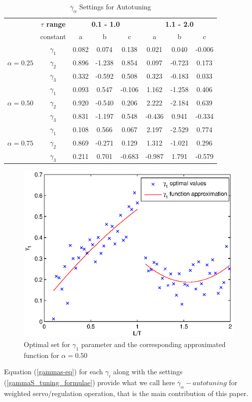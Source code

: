 \begin{table}[htb!]
\begin{center}
\caption{$\overline{\gamma}_{\alpha}$ Settings for Autotuning}
\label{gammas_settings}
\begin{tabular}{cc|ccc|ccc}
\cline{2-8} & \textbf{$\tau$ range} &
\multicolumn{3}{c|}{\textbf{0.1 - 1.0}} &
\multicolumn{3}{c}{\textbf{1.1 - 2.0}} \\ \cline{2-8} & constant &
a & b & c & a & b & c \\ \hline
              & \multicolumn{1}{c|}{$\gamma_1$} &0.082 & 0.074 &0.138 &0.021 & 0.040 &-0.006 \\
$\alpha=0.25$ & \multicolumn{1}{c|}{$\gamma_2$} &0.896 &-1.238 &0.854 &0.097 &-0.723 & 0.173 \\
              & \multicolumn{1}{c|}{$\gamma_3$} &0.332 &-0.592 &0.508 &0.323 &-0.183 & 0.033 \\
\hline
              & \multicolumn{1}{c|}{$\gamma_1$} &0.093 & 0.547 &-0.106 & 1.162 &-1.258 & 0.406 \\
$\alpha=0.50$ & \multicolumn{1}{c|}{$\gamma_2$} &0.920 &-0.540 & 0.206 & 2.222 &-2.184 & 0.639 \\
              & \multicolumn{1}{c|}{$\gamma_3$} &0.831 &-1.197 & 0.548 &-0.436 & 0.941 &-0.334 \\
\hline
              & \multicolumn{1}{c|}{$\gamma_1$} &0.108 & 0.566 & 0.067 & 2.197 &-2.529 & 0.774 \\
$\alpha=0.75$ & \multicolumn{1}{c|}{$\gamma_2$} &0.869 &-0.271 & 0.129 & 1.312 &-1.021 & 0.296 \\
              & \multicolumn{1}{c|}{$\gamma_3$} &0.211 & 0.701 &-0.683 &-0.987 & 1.791 &-0.579 \\
\hline
\end{tabular}
\end{center}
\end{table}

\begin{figure}[htb!]
    \begin{center}
        \includegraphics[width=0.8\linewidth]{gamma1function.eps}
        \caption{Optimal set for $\gamma_1$ parameter and the corresponding approximated function for $\alpha=0.50$}
        \label{gamma1fnc}
    \end{center}
\end{figure}

Equation (\ref{gammas-eq}) for each $\gamma_i$ along with the
settings (\ref{gammaS_tuning_formulae}) provide what we call here
$\overline{\gamma}_{\alpha}-autotuning$ for weighted
servo/regulation operation, that is the main contribution of this
paper.
